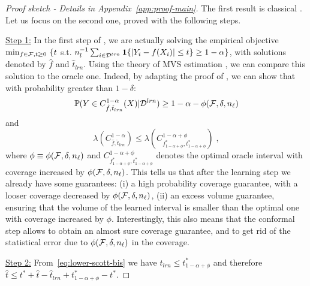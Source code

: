 \begin{proof}[Proof sketch - Details in Appendix~\ref{app:proof-main}] The first result is classical \citep{lei2018distribution}. Let us focus on the second one, proved with the following steps.
    

\underline{Step 1:} In the first step of \method, we are actually solving the empirical objective $\min_{f\in\mathcal{F}, t\geq 0}~ \{t$ s.t. $n_l^{-1}\sum_{i\in{\cal D}^{lrn}}\mathbf{1}\{|Y_i-f(X_i)|\leq t\}\geq 1-\alpha\}$, with solutions denoted by $\hat{f}$ and $\hat{t}_{lrn}$. Using the theory of MVS estimation \citep{NIPS2005_d3d80b65}, we can compare this solution to the oracle one. Indeed, by adapting the proof of \citet[Theorem 1]{NIPS2005_d3d80b65}, we can show that with probability greater than $1-\delta$:
\begin{equation}
    \label{eq:lower-scott}
    {\mathbb{P}}(Y\in C_{\hat{f},\hat{t}_{lrn}}^{1-\alpha}(X)|{\cal D}^{lrn})\geq 1-\alpha - {\phi(\mathcal{F},\delta,n_\ell)}
\end{equation}
and
\begin{equation}
    \label{eq:lower-scott-bis}
    \lambda\left(C_{\hat{f},\hat{t}_{lrn}}^{1-\alpha}\right) \leq \lambda\left(C_{f_{1-\alpha+\phi}^*,t_{1-\alpha+\phi}^*}^{1-\alpha + \phi}\right) \;,
\end{equation}
where $\phi \equiv {\phi(\mathcal{F},\delta,n_\ell)}$ and $C_{f_{1-\alpha+\phi}^*,t_{1-\alpha+\phi}^*}^{1-\alpha + \phi}$ denotes the optimal oracle interval with coverage increased by ${\phi(\mathcal{F},\delta,n_\ell)}$. This tells us that after the learning step we already have some guarantees: (i) a high probability coverage guarantee, with a looser coverage decreased by ${\phi(\mathcal{F},\delta,n_\ell)}$, (ii) an excess volume guarantee, ensuring that the volume of the learned interval is smaller than the optimal one with coverage increased by $\phi$. Interestingly, this also means that the conformal step  allows to obtain an almost sure coverage guarantee, and to get rid of the statistical error due to ${\phi(\mathcal{F},\delta,n_\ell)}$ in the coverage. %

\underline{Step 2:}  %
From~\eqref{eq:lower-scott-bis} we have $\hat{t}_{lrn} \leq t_{1-\alpha+\phi}^*$ and therefore $\hat{t} \leq t^* + \hat{t} - \hat{t}_{lrn} + t_{1-\alpha+\phi}^* - t^*$. 


\end{proof}
